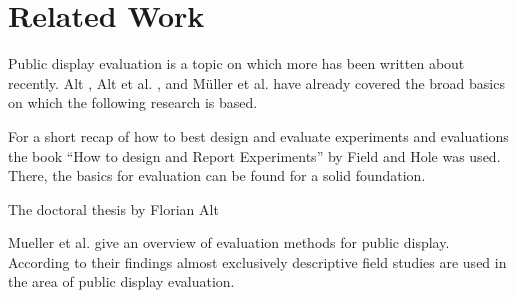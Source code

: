 \section{Related Work} %
\label{sec:related-work}

	Public display evaluation is a topic on which more has been written about recently. 
	Alt \cite{alt2013thesis}, Alt et al. \cite{Alt2012HowToEvaluate}, and M{\"u}ller et al. \cite{muller2014mirrortouch} have already covered the broad basics on which the following research is based.

	For a short recap of how to best design and evaluate experiments and evaluations the book ``How to design and Report Experiments'' by Field and Hole \cite{field2003design} was used. There, the basics for evaluation can be found for a solid foundation.





	The doctoral thesis by Florian Alt \cite{}

	Mueller et al. \cite{muller2014mirrortouch} give an overview of evaluation methods for public display. According to their findings almost exclusively descriptive field studies are used in the area of public display evaluation.













